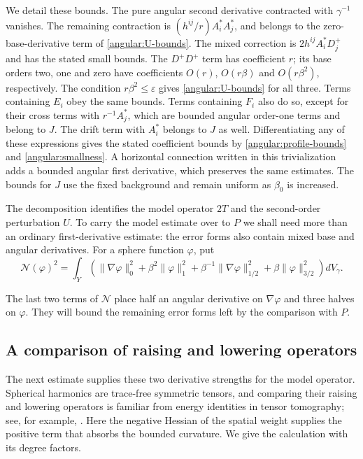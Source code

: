 \documentclass[11pt,a4paper]{article}
\newcommand{\eps}{\varepsilon}
\numberwithin{equation}{section}
\begin{document}
We detail these bounds.  The pure angular second derivative contracted
with $\gamma^{-1}$ vanishes.  The remaining contraction is
$(h^{ij}/r)A_i^*A_j^*$, and belongs to the zero-base-derivative term of
\eqref{angular:U-bounds}.  The mixed correction is
$2h^{ij}A_i^*D_j^+$ and has the stated small bounds.  The $D^+D^+$ term
has coefficient $r$; its base orders two, one and zero have coefficients
$O(r)$, $O(r\beta)$ and $O(r\beta^2)$, respectively.  The condition
$r\beta^2\le\eps$ gives \eqref{angular:U-bounds} for all three.
Terms containing $E_i$ obey the same bounds.  Terms containing $F_i$
also do so, except for their cross terms with $r^{-1}A_j^*$, which are
bounded angular order-one terms and belong to $J$.  The drift term with
$A_i^*$ belongs to $J$ as well.  Differentiating any of these expressions
gives the stated coefficient bounds by
\eqref{angular:profile-bounds} and \eqref{angular:smallness}.
A horizontal connection written in this trivialization adds a bounded
angular first derivative, which preserves the same estimates.  The bounds
for $J$ use the fixed background and remain uniform as $\beta_0$ is
increased.

The decomposition identifies the model operator $2T$ and the
second-order perturbation $U$.  To carry the model estimate over to $P$
we shall need more than an ordinary first-derivative estimate: the error forms
also contain mixed base and angular derivatives.  For a sphere function
$\varphi$, put
\begin{equation}\label{angular:N-definition}
 \mathcal N(\varphi)^2
 =\int_Y\left(
  \|\nabla\varphi\|_0^2+\beta^2\|\varphi\|_1^2
  +\beta^{-1}\|\nabla\varphi\|_{1/2}^2
  +\beta\|\varphi\|_{3/2}^2\right)dV_\gamma.
\end{equation}

The last two terms of $\mathcal N$ place half an angular derivative
on $\nabla\varphi$ and three halves on $\varphi$.  They will bound the
remaining error forms left by the comparison with $P$.

\subsection{A comparison of raising and lowering operators}

The next estimate supplies these two derivative strengths for the model
operator.  Spherical harmonics are trace-free symmetric tensors, and
comparing their raising and lowering operators is familiar from energy
identities in tensor tomography; see, for example, \cite{PSU15,GPSU16}.
Here the negative Hessian of the spatial weight supplies the positive
term that absorbs the bounded curvature.  We give the calculation with
its degree factors.
\end{document}
